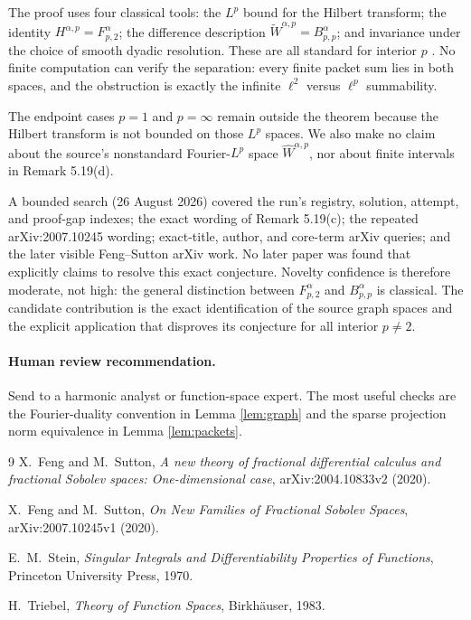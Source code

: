 \documentclass[11pt]{article}
\begin{document}
The proof uses four classical tools: the $L^p$ bound for the Hilbert
transform; the identity $H^{\alpha,p}=F^\alpha_{p,2}$; the difference
description $\widetilde W^{\alpha,p}=B^\alpha_{p,p}$; and invariance under
the choice of smooth dyadic resolution.  These are all standard for interior
$p$ \cite{Stein,Triebel}.  No finite computation can verify the separation:
every finite packet sum lies in both spaces, and the obstruction is exactly
the infinite $\ell^2$ versus $\ell^p$ summability.

The endpoint cases $p=1$ and $p=\infty$ remain outside the theorem because
the Hilbert transform is not bounded on those $L^p$ spaces.  We also make no
claim about the source's nonstandard Fourier-$L^p$ space
$\widehat W^{\alpha,p}$, nor about finite intervals in Remark 5.19(d).

A bounded search (26 August 2026) covered the run's registry, solution,
attempt, and proof-gap indexes; the exact wording of Remark 5.19(c); the
repeated arXiv:2007.10245 wording; exact-title, author, and core-term arXiv
queries; and the later visible Feng--Sutton arXiv work.  No later paper was
found that explicitly claims to resolve this exact conjecture.  Novelty
confidence is therefore moderate, not high: the general distinction between
$F^\alpha_{p,2}$ and $B^\alpha_{p,p}$ is classical.  The candidate
contribution is the exact identification of the source graph spaces and the
explicit application that disproves its conjecture for all interior
$p\ne2$.

\paragraph{Human review recommendation.}
Send to a harmonic analyst or function-space expert.  The most useful checks
are the Fourier-duality convention in Lemma \ref{lem:graph} and the sparse
projection norm equivalence in Lemma \ref{lem:packets}.

\begin{thebibliography}{9}
X.~Feng and M.~Sutton,
\emph{A new theory of fractional differential calculus and fractional Sobolev
spaces: One-dimensional case}, arXiv:2004.10833v2 (2020).

X.~Feng and M.~Sutton,
\emph{On New Families of Fractional Sobolev Spaces},
arXiv:2007.10245v1 (2020).

E.~M.~Stein,
\emph{Singular Integrals and Differentiability Properties of Functions},
Princeton University Press, 1970.

H.~Triebel,
\emph{Theory of Function Spaces},
Birkh\"auser, 1983.
\end{thebibliography}
\end{document}
